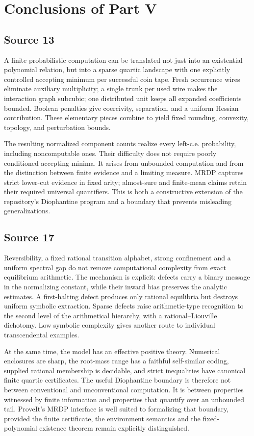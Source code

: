 \documentclass[11pt,letterpaper]{article}
\numberwithin{equation}{section}
\theoremstyle{definition}
\theoremstyle{remark}
\begin{document}
\section{Conclusions of Part V}
\label{pqc:conv:b62-V:conclusions}
\subsection{Source 13}
A finite probabilistic computation can be translated not just into an
existential polynomial relation, but into a sparse quartic landscape with
one explicitly controlled accepting minimum per successful coin tape.
Fresh occurrence wires eliminate auxiliary multiplicity; a single trunk
per used wire makes the interaction graph subcubic; one distributed unit
keeps all expanded coefficients bounded. Boolean penalties give coercivity,
separation, and a uniform Hessian contribution. These elementary pieces
combine to yield fixed rounding, convexity, topology, and perturbation
bounds.

The resulting normalized component counts realize every left-c.e.
probability, including noncomputable ones. Their difficulty does not
require poorly conditioned accepting minima. It arises from unbounded
computation and from the distinction between finite evidence and a
limiting measure. MRDP captures strict lower-cut evidence in fixed arity;
almost-sure and finite-mean claims retain their required universal
quantifiers. This is both a constructive extension of the repository's
Diophantine program and a boundary that prevents misleading generalizations.

\subsection{Source 17}
Reversibility, a fixed rational transition alphabet, strong confinement
and a uniform spectral gap do not remove computational complexity from
exact equilibrium arithmetic. The mechanism is explicit: defects carry
a binary message in the normalizing constant, while their inward bias
preserves the analytic estimates. A first-halting defect produces only
rational equilibria but destroys uniform symbolic extraction. Sparse
defects raise arithmetic-type recognition to the second level of the
arithmetical hierarchy, with a rational--Liouville dichotomy. Low symbolic
complexity gives another route to individual transcendental examples.

At the same time, the model has an effective positive theory. Numerical
enclosures are sharp, the root-mass range has a faithful self-similar
coding, supplied rational membership is decidable, and strict inequalities
have canonical finite quartic certificates. The useful Diophantine
boundary is therefore not between conventional and unconventional
computation. It is between properties witnessed by finite information
and properties that quantify over an unbounded tail. ProveIt's MRDP
interface is well suited to formalizing that boundary, provided the
finite certificate, the environment semantics and the fixed-polynomial
existence theorem remain explicitly distinguished.
\end{document}

